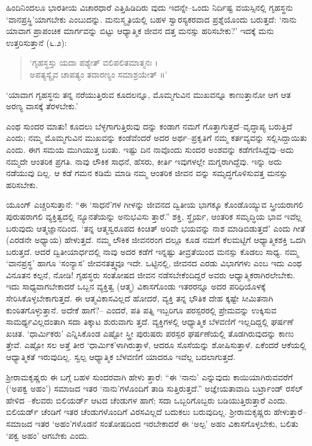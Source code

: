 ಹಿಂದಿನಿಂದಲೂ ಭಾರತೀಯ ವಿಚಾರಧಾರೆ ಎತ್ತಿಹಿಡಿದಿರು ವುದು ಇದನ್ನೇ–ಒಂದು ನಿರ್ದಿಷ್ಟ ವಯಸ್ಸಿನಲ್ಲಿ ಗೃಹಸ್ಥನು ‘ವಾನಪ್ರಸ್ಥಿ’ಯಾಗಬೇಕು ಎಂಬುದನ್ನು. ಮನುಸ್ಮೃತಿಯಲ್ಲಿ ಬಹಳ ಸ್ವಾರಸ್ಯಕರವಾದ ಪ್ರಶ್ನೆಯೊಂದು ಬರುತ್ತದೆ: ‘ನಾನು ಯಾವಾಗ ಪ್ರಾಪಂಚಿಕ ಮಾರ್ಗವನ್ನು ಬಿಟ್ಟು ಆಧ್ಯಾತ್ಮಿಕ ಜೀವನ ದತ್ತ ಮನಸ್ಸು ಹರಿಸಬೇಕು?’ ಇದಕ್ಕೆ ಮನು ಉತ್ತರಿಸುತ್ತಾನೆ (೬.೨):

\begin{verse}
‘ಗೃಹಸ್ಥಸ್ತು ಯದಾ ಪಶ್ಯೇತ್ ವಲಿಪಲಿತಮಾತ್ಮನಃ ।\\ ಅಪತ್ಯಸ್ಯೈವ ಚಾಪತ್ಯಂ ತದಾರಣ್ಯಂ ಸಮಾಶ್ರಯೇತ್ ॥’
\end{verse}

‘ಯಾವಾಗ ಗೃಹಸ್ಥನು ತನ್ನ ನರೆಯುತ್ತಿರುವ ಕೂದಲನ್ನೂ, ಮೊಮ್ಮಗುವಿನ ಮುಖವನ್ನೂ ಕಾಣುತ್ತಾನೋ ಆಗ ಆತ ಅರಣ್ಯ ವಾಸಕ್ಕೆ ತೆರಳಬೇಕು.’

ಎಂಥ ಸುಂದರ ಮಾತು! ಕೂದಲು ಬೆಳ್ಳಗಾಗುತ್ತಿರುವು ದನ್ನು ಕಂಡಾಗ ನಮಗೆ ಗೊತ್ತಾಗುತ್ತದೆ–ವೃದ್ಧಾಪ್ಯ ಬರುತ್ತಿದೆ ಎಂದು; ನಮ್ಮ ಮೊಮ್ಮಗುವಿನ ಮುಖವನ್ನು ಕಂಡೆವೆಂದರೆ ಅದರ ಅರ್ಥ–ಪ್ರಕೃತಿಗೆ ನಮ್ಮ ಕರ್ತವ್ಯವನ್ನು ಸಲ್ಲಿಸಿದ್ದಾಯಿತು ಎಂದು. ಈಗ ಸಮಯ ಮುಗಿಯುತ್ತ ಬಂತು. ಇಷ್ಟು ದಿನ ನಾವೊಂದು ಸುಂದರ ಅಂಶವನ್ನು ಕಡೆಗಣಿಸಿದ್ದೆವು–ಅದು ನಮ್ಮದೇ ಆಂತರಿಕ ಪ್ರಗತಿ. ನಾವು ಲೌಕಿಕ ಸಾಧನೆ, ಹೆಸರು, ಕೀರ್ತಿ ಇವುಗಳಲ್ಲೇ ಮಗ್ನರಾಗಿದ್ದೆವು. ಇನ್ನು ಅದು ನಡೆಯುವು ದಿಲ್ಲ. ಆ ಕಡೆ ಗಮನ ಕಡಿಮೆ ಮಾಡಿ ನಮ್ಮ ಆಂತರಿಕ ಜೀವನ ವನ್ನು ಸಮೃದ್ಧಗೊಳಿಸುವತ್ತ ಮನಸ್ಸು ಹರಿಸಬೇಕು.

ಯೂಂಗ್ ಎಚ್ಚರಿಸುತ್ತಾನೆ: “ಈ ‘ಸಾಧನೆ’ಗಳ ಗೀಳನ್ನು ಜೀವನದ ದ್ವಿತೀಯ ಭಾಗಕ್ಕೂ ಕೊಂಡೊಯ್ಯುವ ಸ್ತ್ರೀಯರಾಗಲಿ ಪುರುಷರಾಗಲಿ ವ್ಯಕ್ತಿತ್ವದಲ್ಲಿ ನ್ಯೂನತೆಯನ್ನು ಅನುಭವಿಸು ತ್ತಾರೆ.” ಶಕ್ತಿ, ಸ್ಥೈರ್ಯ, ಆಂತರಿಕ ಸಮೃದ್ಧಿಯ ಭಾವ ಇವೆಲ್ಲ ಬರುವುದು ಆತ್ಮಜ್ಞಾನದಿಂದ. ‘ತನ್ನ ಆತ್ಮಸ್ವರೂಪದ ಕಿಂಚಿತ್ ಅರಿವೇ ಭಯವನ್ನು ನಾಶ ಮಾಡಿಬಿಡುತ್ತದೆ’ ಎಂದು ಗೀತೆ (ಎರಡನೇ ಅಧ್ಯಾಯ) ಹೇಳುತ್ತದೆ. ನಮ್ಮ ಲೌಕಿಕ ಜೀವನರಂಗ ದಲ್ಲೂ ಕೂಡ ನಮಗೆ ಕೆಲಮಟ್ಟಿಗೆ ಆಧ್ಯಾತ್ಮಿಕಶಕ್ತಿ ಒದಗಿ ಬರುತ್ತದೆ. ಆದರೆ ದ್ವಿತೀಯಾರ್ಧದಲ್ಲಿ ನಾವು ಅದರ ಕಡೆಗೆ ಇನ್ನಷ್ಟು ತೀವ್ರತೆಯಿಂದ ಮನಸ್ಸು ಕೊಡಲು ಸಾಧ್ಯ. ನಮ್ಮ ‘ವಾನಪ್ರಸ್ಥ’ ಹಾಗೂ ‘ಸಂನ್ಯಾಸ’ ಜೀವನತತ್ತ್ವವೂ ಇದೇ. ಒಟ್ಟಿನಲ್ಲಿ, ಜೀವನದ ಎರಡು ವಿಭಾಗಗಳು ಎಂಬ ಇದು ಎಂಥ ವಿನೂತನ ಕಲ್ಪನೆ, ನೋಡಿ! ಗೃಹಸ್ಥರು ಸಂತೋಷದ ಜೀವನ ನಡೆಸಬೇಕೆಂದಿದ್ದರೆ ಅವರು ಆಧ್ಯಾತ್ಮಿಕರಾಗಿರಲೇಬೇಕು. ಇದು ಸಾಧ್ಯವಾಗಬೇಕಾದರೆ ಒಬ್ಬನ ವ್ಯಕ್ತಿತ್ವ (ಆತ್ಮ) ವಿಕಾಸಗೊಂಡು ಇತರರನ್ನೂ ಅದರ ಪರಿಧಿಯೊಳಕ್ಕೆ ಸೇರಿಸಿಕೊಳ್ಳಬೇಕಾಗುತ್ತದೆ. ಈ ಆತ್ಮವಿಕಾಸವಿಲ್ಲದೆ ಹೋದರೆ, ವ್ಯಕ್ತಿ ತನ್ನ ಭೌತಿಕ ದೇಹ ಕ್ಕಷ್ಟೇ ಸೀಮಿತನಾಗಿ ಕುಂಠಿತಗೊಳ್ಳುತ್ತಾನೆ. ಅದೇಕೆ ಹಾಗೆ?– ಎಂದರೆ, ಪತಿ ಪತ್ನಿ ಇಬ್ಬರಿಗೂ ಪರಸ್ಪರರಲ್ಲಿ ಪ್ರೇಮವನ್ನು ಉಕ್ಕಿಸುವ ಸಾಮರ್ಥ್ಯವಿಲ್ಲದಂತಾಗಿ ಸದಾ ತಿಕ್ಕಾಟ ಶುರುವಾಗು ತ್ತದೆ. ವ್ಯಕ್ತಿಗಳಲ್ಲಿ ಆಧ್ಯಾತ್ಮಿಕ ಬೆಳವಣಿಗೆ ಇಲ್ಲದಿದ್ದಲ್ಲಿ ಘರ್ಷಣೆ ಖಚಿತ. ‘ಧಾರ್ಮಿಕರು’ ಎನ್ನಿಸಿಕೊಂಡ ಎಷ್ಟೋ ಸ್ತ್ರೀ ಪುರುಷರು ಪರಸ್ಪರ ಘರ್ಷಣೆಯಲ್ಲಿ ತೊಡಗಿರುವುದನ್ನು ಕಾಣು ತ್ತೇವೆ. ಎಷ್ಟೋ ಸಲ ಅತ್ತೆ ತೀರ ‘ಧಾರ್ಮಿಕ’ಳಾಗಿರುತ್ತಾಳೆ, ಆದರೂ ಸೊಸೆಯನ್ನು ಶೋಷಿಸುತ್ತಾಳೆ. ಏಕೆಂದರೆ ಆಕೆಯಲ್ಲಿ ಆಧ್ಯಾತ್ಮಿಕತೆ ಇರುವುದಿಲ್ಲ. ಸ್ವಲ್ಪ ಆಧ್ಯಾತ್ಮಿಕ ಬೆಳವಣಿಗೆ ಯಾದರೂ ಇವೆಲ್ಲ ಬದಲಾಗುತ್ತದೆ. 

ಶ್ರೀರಾಮಕೃಷ್ಣರು ಈ ಬಗ್ಗೆ ಬಹಳ ಸುಂದರವಾಗಿ ಹೇಳು ತ್ತಾರೆ: “ಈ ‘ನಾನು’ ಎನ್ನುವುದು ಕಾಯಿಯಾಗಿರುವವರೆಗೆ (‘ಅಪಕ್ವ ಅಹಂ’) ಸಮಾಜದ ಇತರ ‘ನಾನು’ಗಳೊಂದಿಗೆ ತಾಡಿ ಸುತ್ತಿರುತ್ತದೆ.” ಅಜ್ಞೇಯತಾವಾದಿ ಬರ್ಟ್ರಾಂಡ್ ರಸೆಲ್ ಹೇಳಿದ –ಕೆಲವರು ಬಿಲಿಯರ್ಡ್ ಆಟದ ಚೆಂಡುಗಳ ಹಾಗೆ; ಸದಾ ಒಬ್ಬರಿಗೊಬ್ಬರು ಬಡಿಯುತ್ತಿರುತ್ತಾರೆ ಎಂದು. ಬಿಲಿಯರ್ಡ್ ಚೆಂಡಿಗೆ ಇತರ ಚೆಂಡುಗಳೊಂದಿಗೆ ವಿರಸವಿಲ್ಲದೆ ಬದುಕಲು ಬರುವುದಿಲ್ಲ. ಶ್ರೀರಾಮಕೃಷ್ಣರು ಹೇಳುತ್ತಾರೆ–ಸಮಾಜದ ಇತರ ‘ಅಹಂ’ಗಳೊಡನೆ ಸಂತೋಷದಿಂದ ಇರಬೇಕಾದರೆ ಈ ‘ಅಲ್ಪ’ ಅಹಂ ವಿಕಾಸಗೊಳ್ಳಬೇಕು, ಬಲಿತು ‘ಪಕ್ವ ಅಹಂ’ ಆಗಬೇಕು ಎಂದು.

